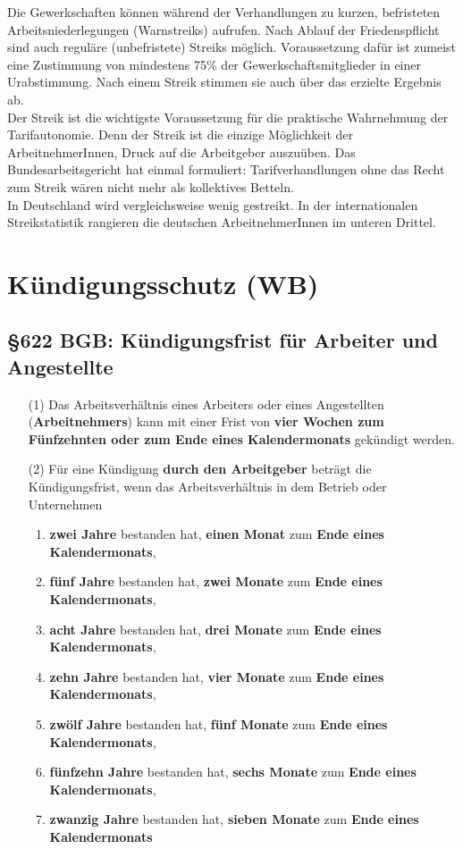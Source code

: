 \documentclass[a4paper, 12pt]{report}
\begin{document}
Die Gewerkschaften können während der Verhandlungen zu kurzen, befristeten
Arbeitsniederlegungen (Warnstreiks) aufrufen. Nach Ablauf der Friedenspflicht
sind auch reguläre (unbefristete) Streiks möglich. Voraussetzung dafür ist
zumeist eine Zustimmung von mindestens 75\% der Gewerkschaftsmitglieder in einer
Urabstimmung. Nach einem Streik stimmen sie auch über das erzielte Ergebnis
ab. \\

Der Streik ist die wichtigste Voraussetzung für die praktische Wahrnehmung der
\glqq Tarifautonomie\grqq{}. Denn der Streik ist die einzige Möglichkeit der
ArbeitnehmerInnen, Druck auf die Arbeitgeber auszuüben. Das Bundesarbeitsgericht
hat einmal formuliert: \glqq Tarifverhandlungen ohne das Recht zum Streik wären
nicht mehr als kollektives Betteln\grqq{}. \\

In Deutschland wird vergleichsweise wenig gestreikt. In der internationalen
Streikstatistik rangieren die deutschen ArbeitnehmerInnen im unteren Drittel.

\section{Kündigungsschutz (WB)}

\subsection{\S 622 BGB: Kündigungsfrist für Arbeiter und Angestellte}

\begin{itemize}
    \item[(1)] Das Arbeitsverhältnis eines Arbeiters oder eines Angestellten
	(\textbf{Arbeitnehmers}) kann mit einer Frist von \textbf{vier Wochen
	zum Fünfzehnten oder zum Ende eines Kalendermonats} gekündigt werden.
    \item[(2)] Für eine Kündigung \textbf{durch den Arbeitgeber} beträgt die
	Kündigungsfrist, wenn das Arbeitsverhältnis in dem Betrieb oder
	Unternehmen
	\begin{enumerate}
	    \item \textbf{zwei Jahre} bestanden hat, \textbf{einen Monat} zum
		\textbf{Ende eines Kalendermonats},
	    \item \textbf{fünf Jahre} bestanden hat, \textbf{zwei Monate} zum
		\textbf{Ende eines Kalendermonats},
	    \item \textbf{acht Jahre} bestanden hat, \textbf{drei Monate} zum
		\textbf{Ende eines Kalendermonats},
	    \item \textbf{zehn Jahre} bestanden hat, \textbf{vier Monate} zum
		\textbf{Ende eines Kalendermonats},
	    \item \textbf{zwölf Jahre} bestanden hat, \textbf{fünf Monate} zum
		\textbf{Ende eines Kalendermonats},
	    \item \textbf{fünfzehn Jahre} bestanden hat, \textbf{sechs Monate}
		zum \textbf{Ende eines Kalendermonats},
	    \item \textbf{zwanzig Jahre} bestanden hat, \textbf{sieben Monate}
		zum \textbf{Ende eines Kalendermonats}
	\end{enumerate}
\end{itemize}
\end{document}

